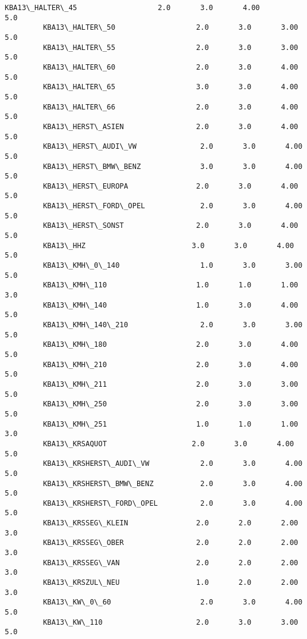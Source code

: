 \documentclass[11pt]{article}
\begin{document}
\begin{Verbatim}[commandchars=\\\{\}]
         KBA13\_HALTER\_45                   2.0       3.0       4.00        5.0  
         KBA13\_HALTER\_50                   2.0       3.0       3.00        5.0  
         KBA13\_HALTER\_55                   2.0       3.0       3.00        5.0  
         KBA13\_HALTER\_60                   2.0       3.0       4.00        5.0  
         KBA13\_HALTER\_65                   3.0       3.0       4.00        5.0  
         KBA13\_HALTER\_66                   2.0       3.0       4.00        5.0  
         KBA13\_HERST\_ASIEN                 2.0       3.0       4.00        5.0  
         KBA13\_HERST\_AUDI\_VW               2.0       3.0       4.00        5.0  
         KBA13\_HERST\_BMW\_BENZ              3.0       3.0       4.00        5.0  
         KBA13\_HERST\_EUROPA                2.0       3.0       4.00        5.0  
         KBA13\_HERST\_FORD\_OPEL             2.0       3.0       4.00        5.0  
         KBA13\_HERST\_SONST                 2.0       3.0       4.00        5.0  
         KBA13\_HHZ                         3.0       3.0       4.00        5.0  
         KBA13\_KMH\_0\_140                   1.0       3.0       3.00        5.0  
         KBA13\_KMH\_110                     1.0       1.0       1.00        3.0  
         KBA13\_KMH\_140                     1.0       3.0       4.00        5.0  
         KBA13\_KMH\_140\_210                 2.0       3.0       3.00        5.0  
         KBA13\_KMH\_180                     2.0       3.0       4.00        5.0  
         KBA13\_KMH\_210                     2.0       3.0       4.00        5.0  
         KBA13\_KMH\_211                     2.0       3.0       3.00        5.0  
         KBA13\_KMH\_250                     2.0       3.0       3.00        5.0  
         KBA13\_KMH\_251                     1.0       1.0       1.00        3.0  
         KBA13\_KRSAQUOT                    2.0       3.0       4.00        5.0  
         KBA13\_KRSHERST\_AUDI\_VW            2.0       3.0       4.00        5.0  
         KBA13\_KRSHERST\_BMW\_BENZ           2.0       3.0       4.00        5.0  
         KBA13\_KRSHERST\_FORD\_OPEL          2.0       3.0       4.00        5.0  
         KBA13\_KRSSEG\_KLEIN                2.0       2.0       2.00        3.0  
         KBA13\_KRSSEG\_OBER                 2.0       2.0       2.00        3.0  
         KBA13\_KRSSEG\_VAN                  2.0       2.0       2.00        3.0  
         KBA13\_KRSZUL\_NEU                  1.0       2.0       2.00        3.0  
         KBA13\_KW\_0\_60                     2.0       3.0       4.00        5.0  
         KBA13\_KW\_110                      2.0       3.0       3.00        5.0  

\end{Verbatim}
\end{document}
